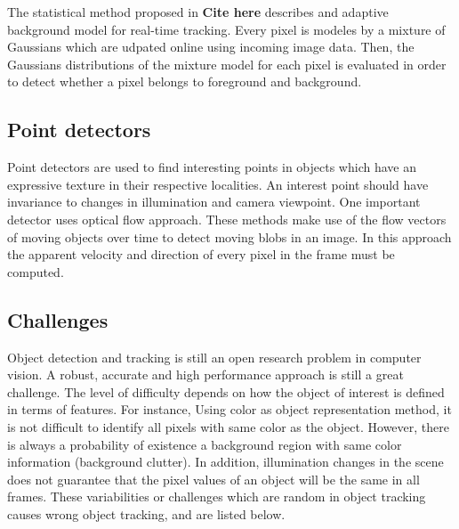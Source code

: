 The statistical method proposed in \textbf{Cite here} describes and adaptive background model for real-time tracking. Every pixel is modeles by a mixture of Gaussians which are udpated online using incoming image data. Then, the Gaussians distributions of the mixture model for each pixel is evaluated in order to detect whether a pixel belongs to foreground and background.

\subsection{Point detectors}

Point detectors are used to find interesting points in objects which have an expressive texture in their respective localities. An interest point should have invariance to changes in illumination and camera viewpoint. One important detector uses optical flow approach. These methods make use of the flow vectors of moving objects over time to detect moving blobs in an image. In this approach the apparent velocity and direction of every pixel in the frame must be computed.

\subsection{Challenges}

Object detection and tracking is still an open research problem in computer vision. A robust, accurate and high performance approach is still a great challenge. The level of difficulty depends on how the object of interest is defined in terms of features. For instance, Using color as object representation method, it is not difficult to identify all pixels with same color as the object. However, there is always a probability of existence a background region with same color information (background clutter). In addition, illumination changes in the scene does not guarantee that the pixel values of an object will be the same in all frames. These variabilities or challenges which are random in object tracking causes wrong object tracking, and are listed below.

